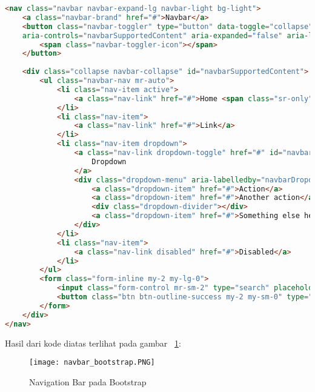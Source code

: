 \begin{lstlisting}[style=customhtml, language=HTML,  basicstyle=\ttfamily, frame=single, columns=fullflexible, keepspaces=true, breaklines=true, showstringspaces=false, label={lst:navBarBootstrap}, caption=Navigation bar pada bootstrap 4.]  
<nav class="navbar navbar-expand-lg navbar-light bg-light">
	<a class="navbar-brand" href="#">Navbar</a>
	<button class="navbar-toggler" type="button" data-toggle="collapse" data-target="#navbarSupportedContent" 
	aria-controls="navbarSupportedContent" aria-expanded="false" aria-label="Toggle navigation">
		<span class="navbar-toggler-icon"></span>
	</button>
	
	<div class="collapse navbar-collapse" id="navbarSupportedContent">
		<ul class="navbar-nav mr-auto">
			<li class="nav-item active">
				<a class="nav-link" href="#">Home <span class="sr-only">(current)</span></a>
			</li>
			<li class="nav-item">
				<a class="nav-link" href="#">Link</a>
			</li>
			<li class="nav-item dropdown">
				<a class="nav-link dropdown-toggle" href="#" id="navbarDropdown" role="button" data-toggle="dropdown" aria-haspopup="true" aria-expanded="false">
					Dropdown
				</a>
				<div class="dropdown-menu" aria-labelledby="navbarDropdown">
					<a class="dropdown-item" href="#">Action</a>
					<a class="dropdown-item" href="#">Another action</a>
					<div class="dropdown-divider"></div>
					<a class="dropdown-item" href="#">Something else here</a>
				</div>
			</li>
			<li class="nav-item">
				<a class="nav-link disabled" href="#">Disabled</a>
			</li>
		</ul>
		<form class="form-inline my-2 my-lg-0">
			<input class="form-control mr-sm-2" type="search" placeholder="Search" aria-label="Search">
			<button class="btn btn-outline-success my-2 my-sm-0" type="submit">Search</button>
		</form>
	</div>
</nav>
\end{lstlisting}

\noindent Hasil dari kode diatas terlihat pada gambar ~\ref{fig:navBarBootstrap}:
\begin{figure} [H]
	\centering  
	\texttt{[image: navbar\_bootstrap.PNG]}  
	\caption{Navigation Bar pada Bootstrap} 
	\label{fig:navBarBootstrap}
\end{figure}

